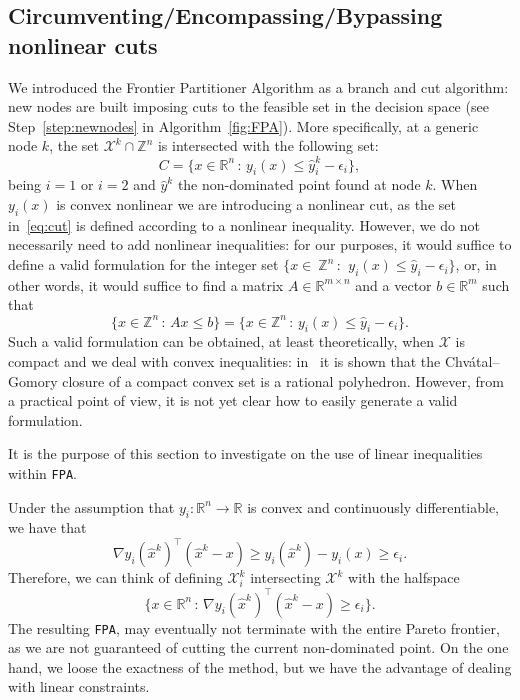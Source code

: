 \documentclass[preprint,12pt]{elsarticle}
\def\R{\mathbb{R}}
\def\Z{\mathbb{Z}}
\begin{document}
\subsection{Circumventing/Encompassing/Bypassing nonlinear cuts}
We introduced the Frontier Partitioner Algorithm as a branch and cut algorithm: new nodes are built imposing cuts
to the feasible set in the decision space (see Step~\ref{step:newnodes} in Algorithm~\ref{fig:FPA}).
More specifically, at a generic node $k$, the set $\mathcal{X}^k \cap \Z^n$ is intersected with the following set:
\begin{equation}\label{eq:cut}
C =\{x\in \R^n\,:\, y_i(x)\leq \hat y^k_i - \epsilon_i \},
\end{equation}
being $i=1$ or $i=2$ and $\hat y^k$ the non-dominated point found at node $k$.
When $y_i(x)$ is convex nonlinear we are introducing a nonlinear cut, as
the set in~\eqref{eq:cut} is defined according to a nonlinear inequality.
However, we do not necessarily need to add nonlinear inequalities:
for our purposes, it would suffice to define a valid formulation for the integer
set $\{x\in~\Z^n\,:\,~y_i(x)\leq\hat y_i - \epsilon_i\}$,
or, in other words, it would suffice to find a matrix $A\in \R^{m\times n}$ and a vector $b\in \R^m$ such that
\begin{equation}\label{eq:lincuts}
\{x\in \Z^n\,:\, A x\leq b\} =  \{x\in \Z^n\,:\, y_i(x)\leq \hat y_i - \epsilon_i \}.
\end{equation}
Such a valid formulation can be obtained, at least theoretically, when $\mathcal{X}$ is compact and we deal with convex inequalities:
in~\cite{dadush:2011, dadush:2014} it is shown that
the Chv\'atal--Gomory closure of a compact convex set is a rational polyhedron.
However, from a practical point of view, it is not yet clear how to easily generate a valid formulation.

It is the purpose of this section to investigate on the use of linear inequalities within \texttt{FPA}.

Under the assumption that $y_i:\R^n \rightarrow \R$ is convex and continuously differentiable, we have that
 \[\nabla y_i(\hat x^k)^\top (\hat x^k - x) \geq y_i(\hat x^k) - y_i(x) \geq \epsilon_i.\]
Therefore, we can think of defining $\mathcal{X}^{k}_i$ intersecting $\mathcal{X}^k$ with the
halfspace \[\{x\in \R^n\,:\, \nabla y_i(\hat x^k)^\top (\hat x^k - x)\geq \epsilon_i\}.\]
The resulting \texttt{FPA}, may eventually not terminate with the entire Pareto frontier, as we are not guaranteed
of cutting the current non-dominated point.
On the one hand, we loose the exactness of the method, but we have the advantage of dealing with linear constraints.
\end{document}
